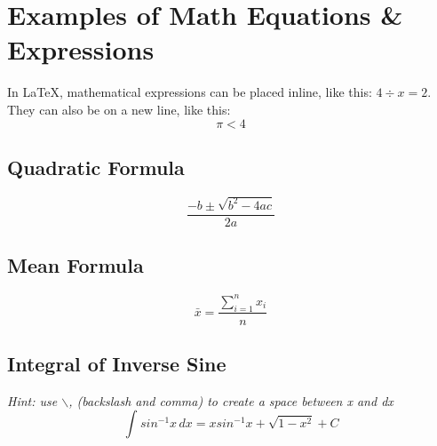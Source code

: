 \section{Examples of Math Equations \& Expressions}
In LaTeX, mathematical expressions can be placed inline, like this: \(4 \div x = 2\).
They can also be on a new line, like this:
\[\pi < 4\]

\subsection{Quadratic Formula}
\[\frac{-b\pm\sqrt{b^{2}-4ac}}{2a}\]

\subsection{Mean Formula}
\[\bar{x} = \frac{\sum_{i=1}^{n} x_i}{n}\]

\subsection{Integral of Inverse Sine}
\textit{Hint: use $\backslash$, (backslash and comma) to create a space between x and dx}
\[\int_{}^{}sin^{-1}x\,dx = xsin^{-1}x + \sqrt{1-x^{2}} + C\]
